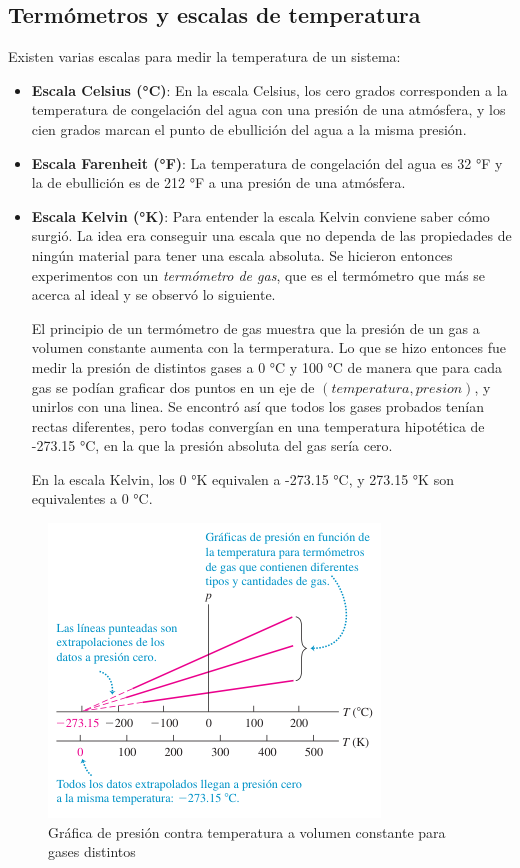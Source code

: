 \documentclass[12pt]{article}
\begin{document}
  \subsection{Termómetros y escalas de temperatura}
  Existen varias escalas para medir la temperatura de un sistema:
  \begin{itemize}
    \item \textbf{Escala Celsius (°C)}: En la escala Celsius, los cero grados corresponden a la temperatura de congelación del agua con una presión de una atmósfera, y los cien grados marcan el punto de ebullición del agua a la misma presión.


    \item \textbf{Escala Farenheit (°F)}: La temperatura de congelación del agua es 32 °F y la de ebullición es de 212 °F a una presión de una atmósfera.

    \item \textbf{Escala Kelvin (°K)}: Para entender la escala Kelvin conviene saber cómo surgió. La idea era conseguir una escala que no dependa de las propiedades de ningún material para tener una escala absoluta. Se hicieron entonces experimentos con un \textit{termómetro de gas}, que es el termómetro que más se acerca al ideal y se observó lo siguiente.

      El principio de un termómetro de gas muestra que la presión de un gas a volumen constante aumenta con la termperatura. Lo que se hizo entonces fue medir la presión de distintos gases a 0 °C y 100 °C de manera que para cada gas se podían graficar dos puntos en un eje de $ (temperatura, presion) $, y unirlos con una linea. Se encontró así que todos los gases probados tenían rectas diferentes, pero todas convergían en una temperatura hipotética de -273.15 °C, en la que la presión absoluta del gas sería cero. 

      En la escala Kelvin, los 0 °K equivalen a -273.15 °C, y 273.15 °K son equivalentes a 0 °C.
  \end{itemize}

  \begin{figure}[H]
    \centering
    \includegraphics[width=0.5\linewidth]{imagenes/escala-Kelvin.png}
    \caption{Gráfica de presión contra temperatura a volumen constante para gases distintos}
    \label{fig:escala-kelvin}
  \end{figure}
  
\end{document}
